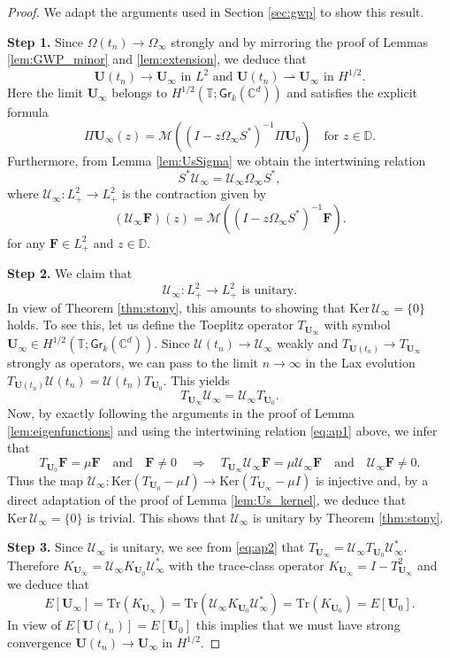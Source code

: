 \documentclass[10pt,reqno,a4paper]{amsart}
\theoremstyle{definition}
\theoremstyle{remark}
\theoremstyle{remark}
\numberwithin{equation}{section}
\newcommand{\C}{\mathbb{C}}
\newcommand{\T}{\mathbb{T}}
\newcommand{\D}{\mathbb{D}}
\newcommand{\Mean}{\mathscr{M}}
\renewcommand{\ker}{\mathrm{Ker}}
\newcommand{\be}{\begin{equation}}
\newcommand{\ee}{\end{equation}}
\newcommand{\weakto}{\rightharpoonup}
\newcommand{\Ub}{\mathbf{U}}
\newcommand{\Fb}{\mathbf{F}}
\newcommand{\id}{I}
\newcommand{\Tr}{\mathrm{Tr}}
\newcommand{\Gr}{\mathsf{Gr}}
\newcommand{\Om}{\Omega}
\newcommand{\Us}{\mathscr{U}}
\begin{document}
\begin{proof}
We adapt the arguments used in Section \ref{sec:gwp} to show this result.

\medskip
\textbf{Step 1.} Since $\Om(t_n) \to \Om_\infty$ strongly and by mirroring the proof of Lemmas \ref{lem:GWP_minor} and \ref{lem:extension}, we deduce that
$$
\mbox{$\Ub(t_n) \to \Ub_\infty$ in $L^2$ and $\Ub(t_n) \weakto \Ub_\infty$ in $H^{1/2}$}.
$$
Here the limit $\Ub_\infty$ belongs to $H^{1/2}(\T; \Gr_k(\C^d))$ and satisfies the explicit formula
 $$
 \Pi \Ub_\infty(z) = \Mean \left ( ( \id - z\Om_\infty S^*)^{-1} \Pi \Ub_0 \right ) \quad \mbox{for $z \in \D$}.
 $$
Furthermore, from Lemma \ref{lem:UsSigma} we obtain the intertwining relation
\be \label{eq:ap1}
S^* \Us_\infty = \Us_\infty \Om_\infty S^*,
\ee
where $\Us_\infty : L^2_+ \to L^2_+$ is the contraction given by
$$
(\Us_\infty \Fb)(z) = \Mean ((\id-z \Om_\infty S^*)^{-1} \Fb).
$$
for any $\Fb \in L^2_+$ and $z \in \D$.

\medskip
\textbf{Step 2.} We claim that
$$
\mbox{$\Us_\infty : L^2_+ \to L^2_+$ is unitary.}
$$
In view of Theorem \ref{thm:stony}, this amounts to showing that $\ker \, \Us_\infty = \{ 0 \}$ holds. To see this, let us define the Toeplitz operator $T_{\Ub_\infty}$ with symbol $\Ub_\infty \in H^{1/2}(\T; \Gr_k(\C^d))$. Since $\Us(t_n) \to \Us_\infty$ weakly and $T_{\Ub(t_n)} \to T_{\Ub_\infty}$ strongly as operators, we can pass to the limit $n \to \infty$ in the Lax evolution $T_{\Ub(t_n)} \Us(t_n) = \Us(t_n) T_{\Ub_0}$. This yields 
\be \label{eq:ap2}
T_{\Ub_\infty} \Us_\infty = \Us_\infty T_{\Ub_0}.
\ee
Now, by exactly following the arguments in the proof of Lemma \ref{lem:eigenfunctions} and using the intertwining relation \eqref{eq:ap1} above, we infer that
$$
T_{\Ub_0} \Fb = \mu \Fb \quad \mbox{and} \quad \Fb \neq 0 \quad \Rightarrow \quad T_{\Ub_\infty} \Us_\infty \Fb = \mu \Us_\infty \Fb \quad \mbox{and} \quad \Us_\infty \Fb \neq 0.
$$ 
Thus the map $\Us_\infty : \ker (T_{\Ub_0} - \mu \id) \to \ker (T_{\Ub_\infty} - \mu \id)$ is injective and, by a direct adaptation of the proof of Lemma \ref{lem:Us_kernel}, we deduce that $\ker \, \Us_\infty = \{ 0 \}$ is trivial. This shows that $\Us_\infty$ is unitary by Theorem \ref{thm:stony}.

\medskip
\textbf{Step 3.} Since $\Us_\infty$ is unitary, we see from \eqref{eq:ap2} that $T_{\Ub_\infty} = \Us_\infty T_{\Ub_0} \Us_\infty^*$. Therefore $K_{\Ub_\infty} = \Us_\infty K_{\Ub_0} \Us_\infty^*$ with the trace-class operator $K_{\Ub_\infty} = \id - T_{\Ub_\infty}^2$ and we deduce that
$$
E[\Ub_\infty] = \Tr (K_{\Ub_\infty}) =  \Tr(\Us_\infty K_{\Ub_0} \Us_\infty^*) =  \Tr(K_{\Ub_0}) = E[\Ub_0].
$$
In view of $E[\Ub(t_n)] = E[\Ub_0]$ this implies that we must have strong convergence  $\Ub(t_n) \to \Ub_\infty$ in $H^{1/2}$.
\end{proof}
\end{document}
